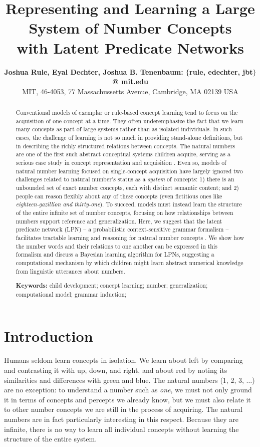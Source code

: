 \documentclass[10pt,letterpaper]{article}
\title{Representing and Learning a Large System of Number Concepts\\with Latent Predicate Networks}
\author{
  {\large \bf Joshua Rule, Eyal Dechter, Joshua B. Tenenbaum: $\{$rule, edechter, jbt$\}$ @ mit.edu}\\
  MIT, 46-4053, 77 Massachussetts Avenue, Cambridge, MA 02139 USA}
\begin{document}
\maketitle

\begin{abstract}
  Conventional models of exemplar or rule-based concept learning tend
  to focus on the acquisition of one concept at a time. They often
  underemphasize the fact that we learn many concepts as part of large
  systems rather than as isolated individuals. In such cases, the
  challenge of learning is not so much in providing stand-alone
  definitions, but in describing the richly structured relations
  between concepts. The natural numbers are one of the first such
  abstract conceptual systems children acquire, serving as a serious
  case study in concept representation and acquisition
  \citep{fuson1988children,galGel2005,Car2009}. Even so, models of
  natural number learning focused on single-concept acquisition have
  largely ignored two challenges related to natural number's status as
  a \emph{system} of concepts: 1) there is an unbounded set of exact
  number concepts, each with distinct semantic content; and 2) people
  can reason flexibly about any of these concepts (even fictitious
  ones like \emph{eighteen-gazillion and thirty-one}). To succeed,
  models must instead learn the structure of the entire infinite set
  of number concepts, focusing on how relationships between numbers
  support reference and generalization.  Here, we suggest that the
  latent predicate network (LPN) -- a probabilistic context-sensitive
  grammar formalism -- facilitates tractable learning and reasoning
  for natural number concepts \citep{DecRulTen2015}. We show how the
  number words and their relations to one another can be expressed in
  this formalism and discuss a Bayesian learning algorithm for LPNs,
  suggesting a computational mechanism by which children might learn
  abstract numerical knowledge from linguistic utterances about
  numbers.

  \textbf{Keywords:}
  child development; concept learning; number; generalization;
  computational model; grammar induction;
\end{abstract}

\section{Introduction}

Humans seldom learn concepts in isolation. We learn about left by
comparing and contrasting it with up, down, and right, and about red
by noting its similarities and differences with green and blue. The
natural numbers (1, 2, 3, $\ldots$) are no exception: to understand a
number such as \emph{one}, we must not only ground it in terms of
concepts and percepts we already know, but we must also relate it to
other number concepts we are still in the process of acquiring. The
natural numbers are in fact particularly interesting in this respect.
Because they are infinite, there is no way to learn all individual
concepts without learning the structure of the entire system.
\end{document}
